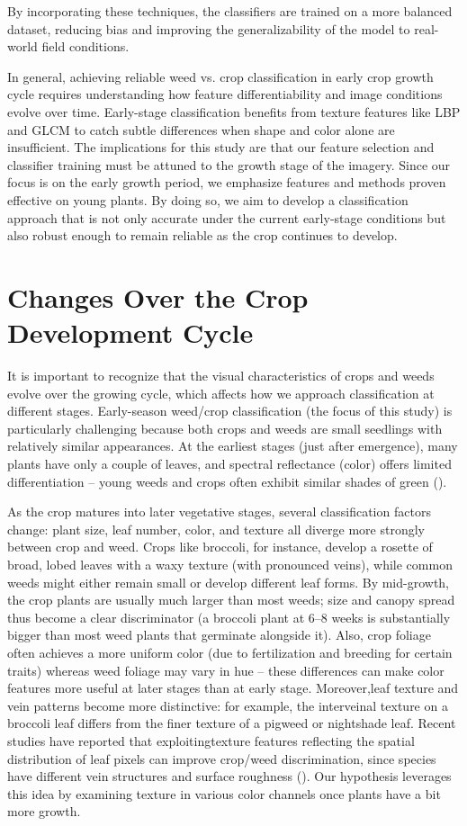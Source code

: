 \documentclass[letterpaper]{report}
\begin{document}
By incorporating these techniques, the classifiers are trained on a more balanced dataset, reducing bias and improving the generalizability of the model to real-world field conditions.

In general, achieving reliable weed vs. crop classification in early crop growth cycle requires understanding how feature differentiability and image conditions evolve over time. Early-stage classification benefits from texture features like LBP and GLCM to catch subtle differences when shape and color alone are insufficient. The implications for this study are that our feature selection and classifier training must be attuned to the growth stage of the imagery. Since our focus is on the early growth period, we emphasize features and methods proven effective on young plants. By doing so, we aim to develop a classification approach that is not only accurate under the current early-stage conditions but also robust enough to remain reliable as the crop continues to develop.

\section{Changes Over the Crop Development Cycle}

It is important to recognize that the visual characteristics of crops and weeds evolve over the growing cycle, which affects how we approach classification at different stages. Early-season weed/crop classification (the focus of this study) is particularly challenging because both crops and weeds are small seedlings with relatively similar appearances. At the earliest stages (just after emergence), many plants have only a couple of leaves, and spectral reflectance (color) offers limited differentiation – young weeds and crops often exhibit similar shades of green (\cite{Garibaldi-Marquez2022-yn}).

As the crop matures into later vegetative stages, several classification factors change: plant size, leaf number, color, and texture all diverge more strongly between crop and weed. Crops like broccoli, for instance, develop a rosette of broad, lobed leaves with a waxy texture (with pronounced veins), while common weeds might either remain small or develop different leaf forms. By mid-growth, the crop plants are usually much larger than most weeds; size and canopy spread thus become a clear discriminator (a broccoli plant at 6–8 weeks is substantially bigger than most weed plants that germinate alongside it). Also, crop foliage often achieves a more uniform color (due to fertilization and breeding for certain traits) whereas weed foliage may vary in hue – these differences can make color features more useful at later stages than at early stage. Moreover,leaf texture and vein patterns become more distinctive: for example, the interveinal texture on a broccoli leaf differs from the finer texture of a pigweed or nightshade leaf. Recent studies have reported that exploitingtexture features reflecting the spatial distribution of leaf pixels can improve crop/weed discrimination, since species have different vein structures and surface roughness (\cite{Garibaldi-Marquez2022-yn}). Our hypothesis leverages this idea by examining texture in various color channels once plants have a bit more growth.
\end{document}
